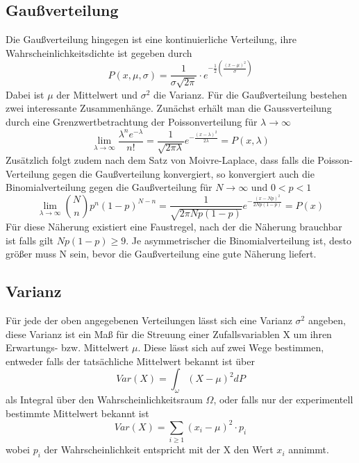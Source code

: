 \documentclass{article}
\begin{document}
            \subsection{Gaußverteilung}
                Die Gaußverteilung hingegen ist eine kontinuierliche Verteilung, ihre Wahrscheinlichkeitsdichte ist
                gegeben durch
                $$ P(x,\mu, \sigma) = \frac{1}{\sigma\sqrt{2\pi}}\cdot e^{-\frac{1}{2}(\frac{(x-\mu)^2}{\sigma})}$$
                Dabei ist $\mu$ der Mittelwert und $\sigma^2$ die Varianz.
                \newline
                Für die Gaußverteilung bestehen zwei interessante Zusammenhänge.
                Zunächst erhält man die Gaussverteilung durch eine Grenzwertbetrachtung der Poissonverteilung für $\lambda\rightarrow\infty$
                $$\lim_{\lambda\rightarrow\infty} \frac{\lambda^n e^{-\lambda}}{n!} = \frac{1}{\sqrt{2\pi\lambda}}e^{-\frac{(x-\lambda)^2}{2\lambda}} = P(x,\lambda)$$
                \newline
                Zusätzlich folgt zudem nach dem Satz von Moivre-Laplace, dass falls die Poisson-Verteilung gegen die Gaußverteilung
                konvergiert, so konvergiert auch die Binomialverteilung gegen die Gaußverteilung für $N \rightarrow \infty$ und $0 < p < 1$
                $$\lim_{\lambda\rightarrow\infty} {N\choose n}p^n(1-p)^{N-n} = \frac{1}{\sqrt{2\pi Np(1-p)}} e^{-\frac{(x-Np)^2}{2Np(1-p)}} = P(x)$$
                Für diese Näherung existiert eine Faustregel, nach der die Näherung brauchbar ist falls gilt $Np(1-p)\geq 9$.
                Je asymmetrischer die Binomialverteilung ist, desto größer muss N sein, bevor die Gaußverteilung eine gute Näherung liefert.
            \subsection{Varianz}
                Für jede der oben angegebenen Verteilungen lässt sich eine Varianz $\sigma^2$ angeben, diese Varianz ist ein Maß für die Streuung
                einer Zufallsvariablen X um ihren Erwartungs- bzw. Mittelwert $\mu$. Diese lässt sich auf zwei Wege bestimmen, entweder falls der
                tatsächliche Mittelwert bekannt ist über
                $$Var(X) = \int_\omega (X-\mu)^2 dP$$
                als Integral über den Wahrscheinlichkeitsraum $\Omega$, oder falls nur der experimentell bestimmte Mittelwert bekannt ist
                $$Var(X) = \sum_{i\geq 1}(x_i - \mu)^2\cdot p_i$$
                wobei $p_i$ der Wahrscheinlichkeit entspricht mit der X den Wert $x_i$ annimmt.
\end{document}
